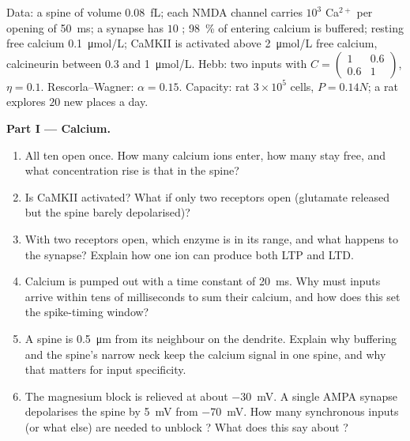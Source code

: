 \begin{problem}
\label{pb:b3:learning-memory:1}
Data: a spine of volume \qty{0.08}{fL}; each NMDA channel carries
$10^{3}$ Ca$^{2+}$ per opening of \qty{50}{ms}; a synapse has $10$ ; \qty{98}{\%} of entering calcium is buffered; resting free
calcium \qty{0.1}{\micro mol/L}; CaMKII is activated above
\qty{2}{\micro mol/L} free calcium, calcineurin between $0.3$ and
\qty{1}{\micro mol/L}. Hebb: two inputs with $C = \begin{pmatrix}1 &
0.6\\ 0.6 & 1\end{pmatrix}$, $\eta = 0.1$. Rescorla--Wagner: $\alpha =
0.15$. Capacity: rat  $3\times 10^{5}$ cells, $P = 0.14N$; a rat
explores $20$ new places a day.

\medskip
\noindent\textbf{Part I --- Calcium.}
\begin{enumerate}
  \item All ten  open once. How many calcium ions enter,
        how many stay free, and what concentration rise is that in the
        spine?
  \item Is CaMKII activated? What if only two receptors open
        (glutamate released but the spine barely depolarised)?
  \item With two receptors open, which enzyme is in its range, and
        what happens to the synapse? Explain how one ion can produce
        both LTP and LTD.
  \item Calcium is pumped out with a time constant of \qty{20}{ms}.
        Why must inputs arrive within tens of milliseconds to sum
        their calcium, and how does this set the spike-timing window?
  \item A spine is \qty{0.5}{\micro m} from its neighbour on the
        dendrite. Explain why buffering and the spine's narrow neck
        keep the calcium signal in one spine, and why that matters for
        input specificity.
  \item The magnesium block is relieved at about \qty{-30}{mV}. A
        single AMPA synapse depolarises the spine by \qty{5}{mV} from
        \qty{-70}{mV}. How many synchronous inputs (or what else) are
        needed to unblock ? What does this say about
        ?
\end{enumerate}


\end{problem}
